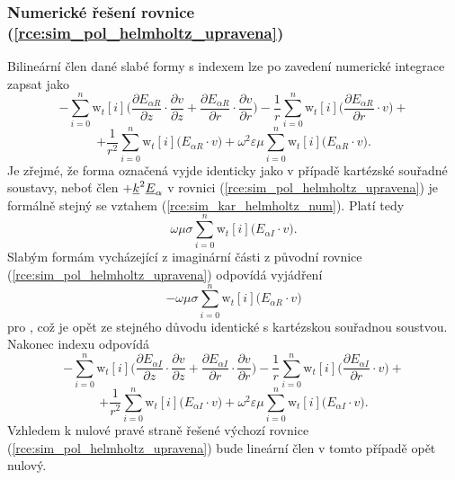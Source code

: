 \subsubsection*{Numerické řešení rovnice (\ref{rce:sim_pol_helmholtz_upravena})}
Bilineární člen dané slabé formy s indexem  lze po zavedení numerické integrace zapsat jako
\begin{displaymath}
-\sum_{i=0}^{n}\mathrm{w}_{t}[i]\bigg(\frac{\partial E_{\alpha R}}{\partial z}\cdot \frac{\partial v}{\partial z} + \frac{\partial E_{\alpha R}}{\partial r}\cdot \frac{\partial v}{\partial r} \bigg) - \frac{1}{r}\sum_{i=0}^{n}\mathrm{w}_{t}[i]\bigg(\frac{\partial E_{\alpha R}}{\partial r}\cdot v\bigg) +
\end{displaymath}
\begin{equation}
	 + \frac{1}{r^{2}}\sum_{i=0}^{n}\mathrm{w}_{t}[i]\bigg(E_{\alpha R}\cdot v\bigg) + \omega^{2}\varepsilon\mu\sum_{i=0}^{n}\mathrm{w}_{t}[i]\bigg(E_{\alpha R}\cdot v\bigg).
	\label{rce:sim_pol_bilinear_real_real} 
\end{equation}
Je zřejmé, že forma označená  vyjde identicky jako v případě kartézské souřadné soustavy, neboť člen $+{\underline{k}}^{2}{\underline{E}}_{\alpha}$ v rovnici (\ref{rce:sim_pol_helmholtz_upravena}) je formálně stejný se vztahem (\ref{rce:sim_kar_helmholtz_num}). Platí tedy
\begin{equation}
 \omega\mu\sigma\sum_{i=0}^{n}\mathrm{w}_{t}[i]\bigg(E_{\alpha I}\cdot v\bigg).
	\label{rce:sim_pol_bilinear_real_imag} 
\end{equation}
Slabým formám vycházející z imaginární části z původní rovnice (\ref{rce:sim_pol_helmholtz_upravena}) odpovídá vyjádření
\begin{equation}
 -\omega\mu\sigma\sum_{i=0}^{n}\mathrm{w}_{t}[i]\bigg(E_{\alpha R}\cdot v\bigg)
	\label{rce:sim_pol_bilinear_imag_imag} 
\end{equation}
pro , což je opět ze stejného důvodu identické s kartézskou souřadnou soustvou. Nakonec indexu  odpovídá
\begin{displaymath}
-\sum_{i=0}^{n}\mathrm{w}_{t}[i]\bigg(\frac{\partial E_{\alpha I}}{\partial z}\cdot \frac{\partial v}{\partial z} + \frac{\partial E_{\alpha I}}{\partial r}\cdot \frac{\partial v}{\partial r} \bigg) - \frac{1}{r}\sum_{i=0}^{n}\mathrm{w}_{t}[i]\bigg(\frac{\partial E_{\alpha I}}{\partial r}\cdot v\bigg) +
\end{displaymath}
\begin{equation}
	 + \frac{1}{r^{2}}\sum_{i=0}^{n}\mathrm{w}_{t}[i]\bigg(E_{\alpha I}\cdot v\bigg) + \omega^{2}\varepsilon\mu\sum_{i=0}^{n}\mathrm{w}_{t}[i]\bigg(E_{\alpha I}\cdot v\bigg).
	\label{rce:sim_pol_bilinear_real_real} 
\end{equation}
Vzhledem k nulové pravé straně řešené výchozí rovnice (\ref{rce:sim_pol_helmholtz_upravena}) bude lineární člen  v tomto případě opět nulový.

